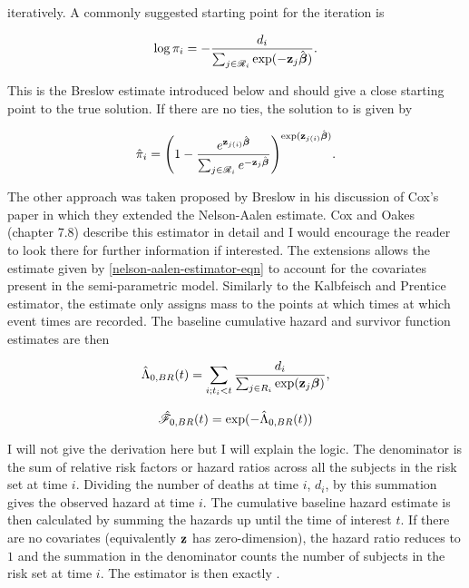 iteratively. A commonly suggested starting point for the iteration is

\begin{equation}
    \log\pi_i = -\frac{d_i}{\sum_{j\in\mathscr{R}_i}\exp(-\textbf{z}_j\hat{\boldsymbol{\beta}})}.
\end{equation}

This is the Breslow estimate introduced below and should give a close starting point to the true solution. If there are no ties, the solution to  is given by

\begin{equation}
    \hat{\pi}_i = \Bigg(1-\frac{e^{\textbf{z}_{j(i)}\hat{\boldsymbol{\beta}}}}{\sum_{j\in\mathscr{R}_i}e^{-\textbf{z}_j\hat{\boldsymbol{\beta}}}}\Bigg)^{\exp(\textbf{z}_{j(i)}\hat{\boldsymbol{\beta}})}.
\end{equation}

The other approach was taken proposed by Breslow in his discussion of Cox's paper in which they extended the Nelson-Aalen estimate. Cox and Oakes  (chapter 7.8) describe this estimator in detail and I would encourage the reader to look there for further information if interested. The extensions allows the estimate given by \ref{nelson-aalen-estimator-eqn} to account for the covariates present in the semi-parametric model. Similarly to the Kalbfeisch and Prentice estimator, the estimate only assigns mass to the points at which times at which event times are recorded. The baseline cumulative hazard and survivor function estimates are then

\begin{equation}
    \hat{\Lambda}_{0,BR}(t)=\sum_{i;t_i<t}\frac{d_i}{\sum_{j\in R_i} \exp(
\textbf{z}_j\boldsymbol{\beta})},
\end{equation}

\begin{equation}
    \hat{\mathscr{F}}_{0,BR}(t)=\exp(-\hat{\Lambda}_{0,BR}(t))
\end{equation}

I will not give the derivation here but I will explain the logic. The denominator is the sum of relative risk factors or hazard ratios across all the subjects in the risk set at time $i$. Dividing the number of deaths at time $i$, $d_i$, by this summation gives the observed hazard at time $i$. The cumulative baseline hazard estimate is then calculated by summing the hazards up until the time of interest $t$. If there are no covariates (equivalently $\textbf{z}$ has zero-dimension), the hazard ratio reduces to $1$ and the summation in the denominator counts the number of subjects in the risk set at time $i$. The estimator is then exactly .

